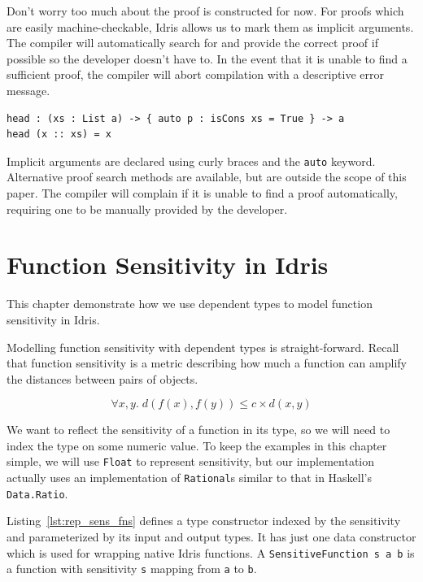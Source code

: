 \documentclass[12pt]{report}
\begin{document}
Don't worry too much about the proof is constructed for now.
For proofs which are easily machine-checkable, Idris allows us to mark them as implicit arguments.
The compiler will automatically search for and provide the correct proof if possible so the developer doesn't have to.
In the event that it is unable to find a sufficient proof, the compiler will abort compilation with a descriptive error message.

\begin{lstlisting}[caption={Automatic proof derivation},label={lst:auto_proof_example}]
head : (xs : List a) -> { auto p : isCons xs = True } -> a
head (x :: xs) = x
\end{lstlisting}

Implicit arguments are declared using curly braces and the \texttt{auto} keyword.
Alternative proof search methods are available, but are outside the scope of this paper.
The compiler will complain if it is unable to find a proof automatically, requiring one to be manually provided by the developer.

\chapter{Function Sensitivity in Idris}\label{sec:function_sensitivity}

This chapter demonstrate how we use dependent types to model function sensitivity in Idris.

Modelling function sensitivity with dependent types is straight-forward.
Recall that function sensitivity is a metric describing how much a function can amplify the distances between pairs of objects.

$$ \forall x,y.\; d(f(x),f(y)) \le c \times d(x,y) $$

We want to reflect the sensitivity of a function in its type, so we will need to index the type on some numeric value.
To keep the examples in this chapter simple, we will use \texttt{Float} to represent sensitivity, but our implementation actually uses an implementation of \texttt{Rational}s similar to that in Haskell's \texttt{Data.Ratio}.

Listing~\ref{lst:rep_sens_fns} defines a type constructor indexed by the sensitivity and parameterized by its input and output types.
It has just one data constructor which is used for wrapping native Idris functions.
A \texttt{SensitiveFunction s a b} is a function with sensitivity \texttt{s} mapping from \texttt{a} to \texttt{b}.
\end{document}
